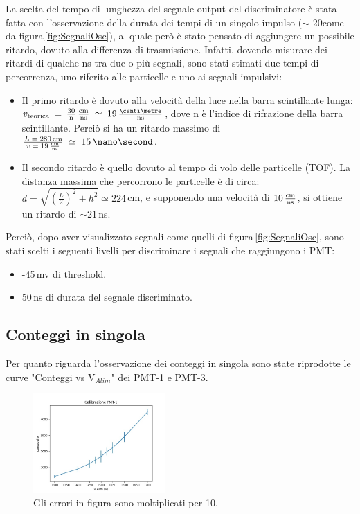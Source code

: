 \documentclass[a4paper,twocolumn]{article}
\begin{document}
La scelta del tempo di lunghezza del segnale output del discriminatore è stata fatta con l'osservazione della durata dei tempi di un singolo impulso ($\sim$-20\:\nano\second\;come da figura\,\ref{fig:SegnaliOsc}), al quale però è stato pensato di aggiungere un possibile ritardo, dovuto alla differenza di trasmissione. Infatti, dovendo misurare dei ritardi di qualche ns tra due o più segnali, sono stati stimati due tempi di percorrenza, uno riferito alle particelle e uno ai segnali impulsivi:

\begin{itemize}
\item Il primo ritardo è dovuto alla velocità della luce nella barra scintillante lunga: $v_{\textnormal{teorica}}$ = $\frac{30}{\textnormal{n}} \, \frac{\textnormal{cm}}{\textnormal{ns}} \; \simeq \; 19 \,\frac{\centi\metre}{\textnormal{ns}}$, dove n è l'indice di rifrazione della barra scintillante. Perciò si ha un ritardo massimo di $\frac{L \; = \; 280 \, \textnormal{cm}}{v \; = \; 19\, \frac{\textnormal{cm}}{\textnormal{ns}}} \; \simeq \; 15\,\nano\second$.
\item Il secondo ritardo è quello dovuto al tempo di volo delle particelle (TOF). La distanza massima che percorrono le particelle è di circa: $d = \sqrt{(\frac{L}{2})^2 + h^2} \simeq 224$\,cm, e supponendo una velocità di $10\,\frac{\textnormal{cm}}{\textnormal{ns}}$, si ottiene un ritardo di $\sim 21$\,ns.
\end{itemize}

Perciò, dopo aver visualizzato segnali come quelli di figura\,\ref{fig:SegnaliOsc}, sono stati scelti i seguenti livelli per discriminare i segnali che raggiungono i PMT:

\begin{itemize}
\item -45\,mv di threshold.
\item 50\,ns di durata del segnale discriminato.
\end{itemize}

\subsection{Conteggi in singola}
\label{sec:CalSin}
Per quanto riguarda l'osservazione dei conteggi in singola sono state riprodotte le curve "Conteggi vs V$_{Alim}$" dei PMT-1 e PMT-3.

\begin{figure}[H]
\centering
\includegraphics[width=0.45\textwidth]{./immagini/TimeOfFlight/CalSinPMT-1.jpg}
\caption{Gli errori in figura sono moltiplicati per 10.}
\label{fig:CalSinPMT-1}
\end{figure}
\end{document}
